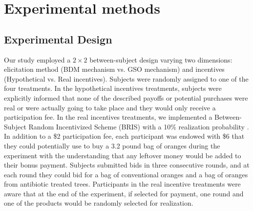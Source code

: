 \documentclass[12pt]{article}
\begin{document}


\section{Experimental methods}
\label{Experiment}

\subsection{Experimental Design}
Our study employed a $2\times2$ between-subject design varying two dimensions: elicitation method (BDM mechanism vs. GSO mechanism) and incentives (Hypothetical vs. Real incentives). Subjects were randomly assigned to one of the four treatments. In the hypothetical incentives treatments, subjects were explicitly informed that none of the described payoffs or potential purchases were real or were actually going to take place and they would only receive a participation fee. In the real incentives treatments, we implemented a Between-Subject Random Incentivized Scheme (BRIS) with a 10\% realization probability \citep{ahles_testing_2024}. In addition to a \$2 participation fee, each participant was endowed with \$6 that they could potentially use to buy a 3.2 pound bag of oranges during the experiment with the understanding that any leftover money would be added to their bonus payment. Subjects submitted bids in three consecutive rounds, and at each round they could bid for a bag of conventional oranges and a bag of oranges from antibiotic treated trees. Participants in the real incentive treatments were aware that at the end of the experiment, if selected for payment, one round and one of the products would be randomly selected for realization.%
\end{document}
